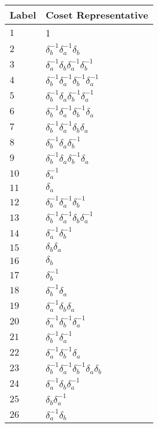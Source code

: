\documentclass{article}
\begin{document}

\begin{center}
\begin{tabular}{ll}
\toprule
Label & Coset Representative\\
\midrule
$1$ & 1 \\
$2$ & $\delta_b^{-1}\delta_a^{-1}\delta_b^{}$ \\
$3$ & $\delta_a^{-1}\delta_b^{}\delta_a^{-1}\delta_b^{-1}$ \\
$4$ & $\delta_b^{-1}\delta_a^{-1}\delta_b^{-1}\delta_a^{-1}$ \\
$5$ & $\delta_b^{-1}\delta_a^{}\delta_b^{-1}\delta_a^{-1}$ \\
$6$ & $\delta_b^{-1}\delta_a^{-1}\delta_b^{-1}\delta_a^{}$ \\
$7$ & $\delta_b^{-1}\delta_a^{-1}\delta_b^{}\delta_a^{}$ \\
$8$ & $\delta_b^{-1}\delta_a^{}\delta_b^{-1}$ \\
$9$ & $\delta_b^{-1}\delta_a^{}\delta_b^{-1}\delta_a^{}$ \\
$10$ & $\delta_a^{-1}$ \\
$11$ & $\delta_a^{}$ \\
$12$ & $\delta_b^{-1}\delta_a^{-1}\delta_b^{-1}$ \\
$13$ & $\delta_b^{-1}\delta_a^{-1}\delta_b^{}\delta_a^{-1}$ \\
$14$ & $\delta_a^{-1}\delta_b^{-1}$ \\
$15$ & $\delta_b^{}\delta_a^{}$ \\
$16$ & $\delta_b^{}$ \\
$17$ & $\delta_b^{-1}$ \\
$18$ & $\delta_b^{-1}\delta_a^{}$ \\
$19$ & $\delta_a^{-1}\delta_b^{}\delta_a^{}$ \\
$20$ & $\delta_a^{-1}\delta_b^{-1}\delta_a^{-1}$ \\
$21$ & $\delta_b^{-1}\delta_a^{-1}$ \\
$22$ & $\delta_a^{-1}\delta_b^{-1}\delta_a^{}$ \\
$23$ & $\delta_b^{-1}\delta_a^{-1}\delta_b^{-1}\delta_a^{}\delta_b^{}$ \\
$24$ & $\delta_a^{-1}\delta_b^{}\delta_a^{-1}$ \\
$25$ & $\delta_b^{}\delta_a^{-1}$ \\
$26$ & $\delta_a^{-1}\delta_b^{}$ \\
\bottomrule
\end{tabular}
\hfill
\begin{tabular}{ll}

\end{tabular}
\end{center}
\end{document}
